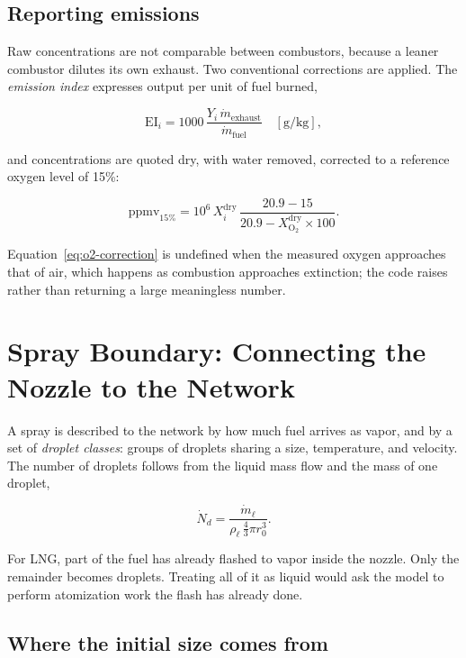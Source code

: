 \documentclass[11pt]{article}
\begin{document}
\subsection{Reporting emissions}

Raw concentrations are not comparable between combustors, because a leaner combustor
dilutes its own exhaust. Two conventional corrections are applied. The \emph{emission
index} expresses output per unit of fuel burned,

\begin{equation}
  \mathrm{EI}_i=1000\,\frac{Y_i\,\dot m_{\mathrm{exhaust}}}{\dot m_{\mathrm{fuel}}}
  \quad[\mathrm{g/kg}],
  \label{eq:emission-index}
\end{equation}

and concentrations are quoted dry, with water removed, corrected to a reference oxygen
level of 15\%:

\begin{equation}
  \mathrm{ppmv}_{15\%}=10^{6}\,X_i^{\mathrm{dry}}\,
  \frac{20.9-15}{20.9-X_{\mathrm{O_2}}^{\mathrm{dry}}\times100}.
  \label{eq:o2-correction}
\end{equation}

Equation~\eqref{eq:o2-correction} is undefined when the measured oxygen approaches that
of air, which happens as combustion approaches extinction; the code raises rather than
returning a large meaningless number.

\section{Spray Boundary: Connecting the Nozzle to the Network}

A spray is described to the network by how much fuel arrives as vapor, and by a set of
\emph{droplet classes}: groups of droplets sharing a size, temperature, and velocity.
The number of droplets follows from the liquid mass flow and the mass of one droplet,

\begin{equation}
  \dot N_d=\frac{\dot m_{\ell}}{\rho_{\ell}\,\tfrac{4}{3}\pi r_0^{3}}.
  \label{eq:number-rate}
\end{equation}

For LNG, part of the fuel has already flashed to vapor inside the nozzle. Only the
remainder becomes droplets. Treating all of it as liquid would ask the model to perform
atomization work the flash has already done.

\subsection{Where the initial size comes from}
\end{document}

